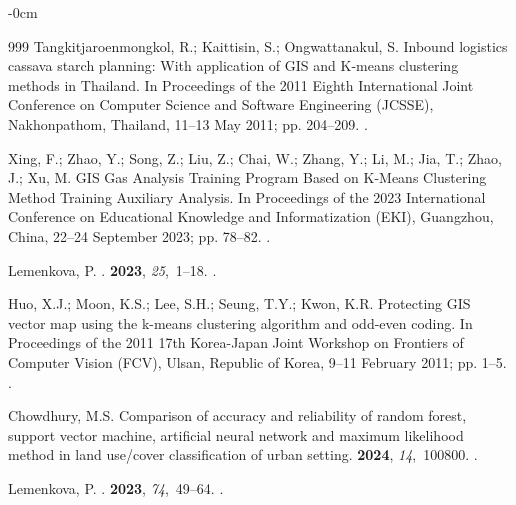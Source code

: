 \documentclass[jimaging,article,accept,pdftex,moreauthors]{Definitions/mdpi}
\begin{document}
\begin{adjustwidth}{-\extralength}{0cm}
\begin{thebibliography}{999}
Tangkitjaroenmongkol, R.; Kaittisin, S.; Ongwattanakul, S.
\newblock Inbound logistics cassava starch planning: With application of GIS
  and K-means clustering methods in Thailand.
\newblock In Proceedings of the 2011 Eighth International Joint Conference on
  Computer Science and Software Engineering (JCSSE),  Nakhonpathom, Thailand, 11--13 May 2011; pp. 204--209.
.

Xing, F.; Zhao, Y.; Song, Z.; Liu, Z.; Chai, W.; Zhang, Y.; Li, M.; Jia, T.;
  Zhao, J.; Xu, M.
\newblock GIS Gas Analysis Training Program Based on K-Means Clustering Method
  Training Auxiliary Analysis.
\newblock In Proceedings of the 2023 International Conference on Educational
  Knowledge and Informatization (EKI), Guangzhou, China, 22--24 September  2023; pp. 78--82.
.

Lemenkova, P.
.
  {\bf 2023}, {\em 25},~1--18.
.

Huo, X.J.; Moon, K.S.; Lee, S.H.; Seung, T.Y.; Kwon, K.R.
\newblock Protecting GIS vector map using the k-means clustering algorithm and
  odd-even coding.
\newblock In Proceedings of the 2011 17th Korea-Japan Joint Workshop on
  Frontiers of Computer Vision (FCV), Ulsan, Republic of Korea, 9--11 February 2011; pp. 1--5.
.

Chowdhury, M.S.
\newblock Comparison of accuracy and reliability of random forest, support
  vector machine, artificial neural network and maximum likelihood method in
  land use/cover classification of urban setting.
 {\bf 2024}, {\em 14},~100800.
.

Lemenkova, P.
.
 {\bf 2023}, {\em 74},~49--64.
.


\end{thebibliography}
\end{adjustwidth}
\end{document}
